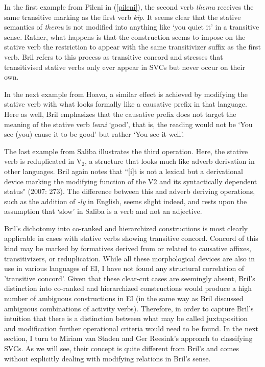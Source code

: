 In the first example from Pileni in (\ref{pileni}), the second verb \textit{themu} receives the same transitive marking as the first verb \textit{kip}. It seems clear that the stative semantics of \textit{themu} is not modified into anything like `you quiet it' in a transitive sense. Rather, what happens is that the construction seems to impose on the stative verb the restriction to appear with the same transitivizer suffix as the first verb. Bril refers to this process as transitive concord and stresses that transitivised stative verbs only ever appear in SVCs but never occur on their own.

In the next example from Hoava, a similar effect is achieved by modifying the stative verb with what looks formally like a causative prefix in that language. Here as well, Bril emphasizes that the causative prefix does not target the meaning of the stative verb \textit{leani} `good', that is, the reading would not be `You see (you) cause it to be good' but rather `You see it well'.

The last example from Saliba illustrates the third operation. Here, the stative verb is reduplicated in V$_2$, a structure that looks much like adverb derivation in other languages. Bril again notes that ``[i]t is not a lexical but a derivational device marking the modifying function of the V2 and its syntactically dependent status" (2007: 273). The difference between this and adverb deriving operations, such as the addition of \textit{-ly} in English, seems slight indeed, and rests upon the assumption that `slow' in Saliba is a verb and not an adjective.

Bril's dichotomy into co-ranked and hierarchized constructions is most clearly applicable in cases with stative verbs showing transitive concord. Concord of this kind may be marked by formatives derived from or related to causative affixes, transitivizers, or reduplication. While all these morphological devices are also in use in various languages of EI, I have not found any structural correlation of 'transitive concord'. Given that these clear-cut cases are seemingly absent, Bril's distinction into co-ranked and hierarchized constructions would produce a high number of ambiguous constructions in EI (in the same way as Bril discussed ambiguous combinations of activity verbs). Therefore, in order to capture Bril's intuition that there is a distinction between what may be called juxtaposition and modification further operational criteria would need to be found. In the next section, I turn to Miriam van Staden and Ger Reesink's approach to classifying SVCs. As we will see, their concept is quite different from Bril's and comes without explicitly dealing with modifying relations in Bril's sense.

